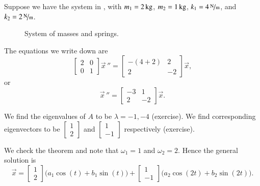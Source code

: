 \documentclass[12pt]{book}
\begin{document}
\begin{example}
Suppose we have the system in , with
$m_1 = \unit[2]{kg}$, $m_2 = \unit[1]{kg}$, $k_1 = \unitfrac[4]{N}{m}$, and
$k_2 = \unitfrac[2]{N}{m}$.

\begin{figure}[h!t]
\capstart
\begin{center}
\caption{System of masses and springs.\label{sosa:twocartswallfig}}
\end{center}
\end{figure}

The equations we write down are
\begin{equation*}
\begin{bmatrix}
2 & 0 \\
0 & 1
\end{bmatrix}
{\vec{x}\,}'' =
\begin{bmatrix}
-(4+2) & 2 \\
2 & -2
\end{bmatrix}
\vec{x} ,
\end{equation*}
or
\begin{equation*}
{\vec{x}\,}'' =
\begin{bmatrix}
-3 & 1 \\
2 & -2
\end{bmatrix}
\vec{x} .
\end{equation*}

We find the eigenvalues of $A$ to be $\lambda = -1, -4$ (exercise).
We find corresponding eigenvectors to be
$\left[ \begin{smallmatrix} 1 \\ 2 \end{smallmatrix} \right]$ and
$\left[ \begin{smallmatrix} 1 \\ -1 \end{smallmatrix} \right]$ respectively
(exercise).

We check the theorem and note that $\omega_1 = 1$ and $\omega_2 = 2$.
Hence the general solution is
\begin{equation*}
\vec{x} = 
\begin{bmatrix} 1 \\ 2 \end{bmatrix}
\bigl( a_1 \cos (t) + b_1 \sin (t) \bigr)
+
\begin{bmatrix} 1 \\ -1 \end{bmatrix}
\bigl( a_2 \cos (2t) + b_2 \sin (2t) \bigr) .
\end{equation*}


\end{example}
\end{document}
